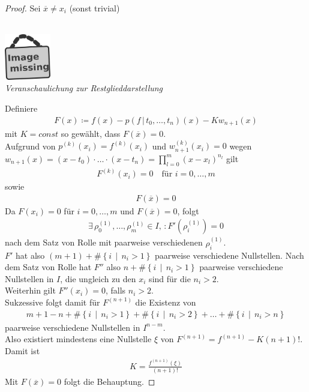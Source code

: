 \documentclass[ngerman,fontsize=11pt, paper=a4, parskip=half, titlepage=true, toc=bib]{scrbook}
\theoremstyle{definition}
\theoremstyle{plain}
\newcommand{\imagemissing}[1]{
  \begin{center}~\\
    \centering 
    \includegraphics[width=2cm]{images/image_missing.jpg}\\
    \textit{#1} \\
  \end{center}
}
\begin{document}
\begin{proof}
  Sei $\overline{x}\neq x_i$ (sonst trivial)
\imagemissing{Veranschaulichung zur Restglieddarstellung}


Definiere
\begin{gather*}
  F(x) \coloneqq f(x)-p(f\,|\, t_0,\dots , t_n)(x) - Kw_{n+1}(x)
\end{gather*}
mit $K=const$ so gewählt, dass $F(\overline{x})=0$.\\
Aufgrund von $p^{(k)}(x_i)=f^{(k)}(x_i)$
und $w_{n+1}^{(k)}(x_i) = 0$ wegen
$w_{n+1}(x) =
(x-t_0)\cdot\dots\cdot(x-t_n)=\prod_{l=0}^{m}(x-x_l)^{n_l}$
gilt
\begin{gather*}
  F^{(k)}(x_i) = 0 
  \quad \text{für } i=0,\dots,m 
\end{gather*}
sowie
\begin{gather*}
  F(\overline{x})=0
\end{gather*}
Da $F(x_i)=0$ für $i=0,\dots,m$ und $F(\overline{x})=0$, folgt
\begin{gather*}
  \exists\, \rho_0^{(1)},\dots,\rho_m^{(1)}\in I,\,
  : F'(\rho_i^{(1)})=0
\end{gather*}
nach dem Satz von Rolle 
mit paarweise verschiedenen $\rho_i^{(1)}$. \\
$F'$ hat also $(m+1)+\#\left\{i\,\middle\vert\, n_i>1\right\}$
paarweise verschiedene Nullstellen.
Nach dem Satz von Rolle hat $F''$ also 
$n+\#\left\{i\,\middle\vert\, n_i>1\right\}$
paarweise verschiedene Nullstellen in $I$,
die ungleich zu den $x_i$ sind für die $n_i>2$.\\
Weiterhin gilt $F''(x_i)=0$, falls $n_i>2$.\\
Sukzessive folgt damit für $F^{(n+1)}$ die Existenz von
\begin{gather*}
  m+1-n + \#\left\{i\,\middle\vert\, n_i>1\right\}
        + \#\left\{i\,\middle\vert\, n_i>2\right\}
        + \dots 
        + \#\left\{i\,\middle\vert\, n_i>n\right\}
\end{gather*}
paarweise verschiedene Nullstellen in $I^{n-m}$.\\
Also existiert mindestens eine Nullstelle $\xi$ von
$F^{(n+1)}=f^{(n+1)}-K(n+1)!$. Damit ist
\begin{gather*}
K=\frac{f^{(n+1)}(\xi)}{(n+1)!}
\end{gather*}
Mit $F(\overline{x}) =0$ folgt die Behauptung.
\end{proof}
\end{document}
